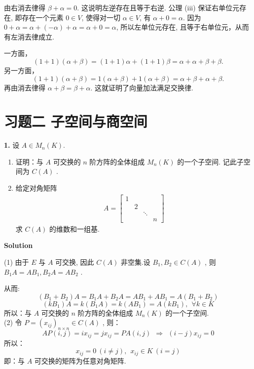 \documentclass[11pt,a4paper,openany,oneside]{book}
\newcommand\Solution{\noindent\textbf{\textsf{Solution}}\par\medskip}
\begin{document}
由右消去律得 $\beta+\alpha=0$. 这说明左逆存在且等于右逆.
公理 (iii) 保证右单位元存在, 即存在一个元素 $0\in V$, 使得对一切
$\alpha\in V$, 有 $\alpha+0=\alpha$. 因为 $0+\alpha=\alpha+(-\alpha)+\alpha=\alpha+0=\alpha$, 所以左单位元存在, 且等于右单位元，从而有左消去律成立.



一方面，
$$
(1+1)(\alpha+\beta)=(1+1)\alpha+(1+1)\beta=\alpha+\alpha+\beta+\beta.
$$
另一方面，
$$
(1+1)(\alpha+\beta)=1(\alpha+\beta)+1(\alpha+\beta)=\alpha+\beta+\alpha+\beta.
$$
再由消去律得 $\alpha+\beta=\beta+\alpha$. 这就证明了向量加法满足交换律.



\section{习题二 \quad 子空间与商空间}

\begin{myexample}
	\textbf{1.} 
设 $ A \in M_n(K) $.
\begin{enumerate}[(1)]
\item 证明：与 $ A $ 可交换的 $ n $ 阶方阵的全体组成 $ M_n(K) $ 的一个子空间. 记此子空间为 $ C(A) $ . 
\item 给定对角矩阵 
\begin{gather*}
A=
\begin{bmatrix} 
1 &    &   &   \\ 
& 2  &   &   \\
&    & \ddots & \\
&    &    &  n  
\end{bmatrix} 
\end{gather*}
求 $ C(A) $ 的维数和一组基. 
\end{enumerate}
\end{myexample}
\Solution

(1) 由于 $ E $ 与 $ A $ 可交换, 因此 $ C(A) $ 非空集.设 $ B_1, B_2 \in C(A) $ , 则 $ B_1A = AB_1, B_2A = AB_2 $ .

\hspace{4.1em} 从而:
 $$  (B_1+B_2)A = B_1A + B_2A = AB_1 + AB_1 = A(B_1 + B_2)  $$ 
 $$  (kB_1)A = k(B_1A) = k(AB_1) = A(kB_1), \ \ \forall k \in K  $$ 
所以：与 $ A $ 可交换的 $ n $ 阶方阵的全体组成 $ M_n(K) $ 的一个子空间. \\

(2) 令 $  P = (x_{ij})_{n \times n} \in C(A) $ , 则：
 $$  AP(i,j) = ix_{ij} = jx_{ij} = PA(i,j) \ \ \Rightarrow \ \ (i-j)x_{ij} = 0  $$ 
所以：
 $$  x_{ij} = 0 \ (i \neq j), \ \ x_{ij} \in K \ (i = j)  $$ 
即：与 $ A $ 可交换的矩阵为任意对角矩阵.
\end{document}
